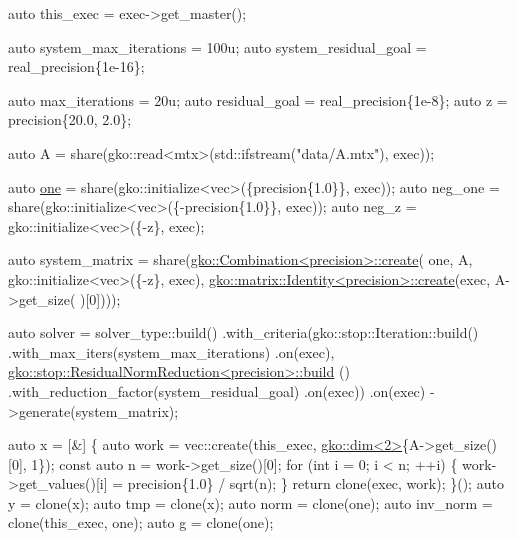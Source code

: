 \begin{DoxyCodeInclude}
    \textcolor{keyword}{auto} this\_exec = exec->get\_master();

    \textcolor{keyword}{auto} system\_max\_iterations = 100u;
    \textcolor{keyword}{auto} system\_residual\_goal = real\_precision\{1e-16\};

    \textcolor{keyword}{auto} max\_iterations = 20u;
    \textcolor{keyword}{auto} residual\_goal = real\_precision\{1e-8\};
    \textcolor{keyword}{auto} z = precision\{20.0, 2.0\};

    \textcolor{keyword}{auto} A = share(gko::read<mtx>(std::ifstream(\textcolor{stringliteral}{"data/A.mtx"}), exec));

    \textcolor{keyword}{auto} \hyperlink{namespacegko_a0059e27f8f4bc348ff65c1e60caf47c8}{one} = share(gko::initialize<vec>(\{precision\{1.0\}\}, exec));
    \textcolor{keyword}{auto} neg\_one = share(gko::initialize<vec>(\{-precision\{1.0\}\}, exec));
    \textcolor{keyword}{auto} neg\_z = gko::initialize<vec>(\{-z\}, exec);

    \textcolor{keyword}{auto} system\_matrix = share(\hyperlink{classgko_1_1Combination}{gko::Combination<precision>::create}(
        one, A, gko::initialize<vec>(\{-z\}, exec),
        \hyperlink{classgko_1_1matrix_1_1Identity}{gko::matrix::Identity<precision>::create}(exec, A->get\_size(
      )[0])));

    \textcolor{keyword}{auto} solver =
        solver\_type::build()
            .with\_criteria(gko::stop::Iteration::build()
                               .with\_max\_iters(system\_max\_iterations)
                               .on(exec),
                           \hyperlink{classgko_1_1stop_1_1ResidualNormReduction}{gko::stop::ResidualNormReduction<precision>::build}
      ()
                               .with\_reduction\_factor(system\_residual\_goal)
                               .on(exec))
            .on(exec)
            ->generate(system\_matrix);


    \textcolor{keyword}{auto} x = [&] \{
        \textcolor{keyword}{auto} work = vec::create(this\_exec, \hyperlink{structgko_1_1dim}{gko::dim<2>}\{A->get\_size()[0], 1\});
        \textcolor{keyword}{const} \textcolor{keyword}{auto} n = work->get\_size()[0];
        \textcolor{keywordflow}{for} (\textcolor{keywordtype}{int} i = 0; i < n; ++i) \{
            work->get\_values()[i] = precision\{1.0\} / sqrt(n);
        \}
        \textcolor{keywordflow}{return} clone(exec, work);
    \}();
    \textcolor{keyword}{auto} y = clone(x);
    \textcolor{keyword}{auto} tmp = clone(x);
    \textcolor{keyword}{auto} norm = clone(one);
    \textcolor{keyword}{auto} inv\_norm = clone(this\_exec, one);
    \textcolor{keyword}{auto} g = clone(one);


\end{DoxyCodeInclude}
